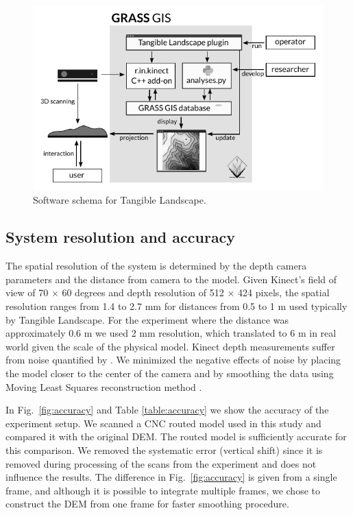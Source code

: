\documentclass[prodmode,acmtochi]{acmsmall} %
\begin{document}
\begin{figure}
\begin{center}
		\includegraphics{images/software-schema.pdf}
	\caption{Software schema for Tangible Landscape.}
	\label{fig:software_schema}
\end{center}
\end{figure}

\subsection{System resolution and accuracy}
The spatial resolution of the system is determined by the depth camera parameters
and the distance from camera to the model. Given Kinect's field of view of 70 $\times$ 60 degrees
and depth resolution of 512 $\times$ 424 pixels, the spatial resolution ranges
from 1.4 to 2.7 mm for distances from 0.5 to 1 m used typically by Tangible Landscape.
For the experiment where the distance was approximately 0.6 m we used 2 mm resolution, which
translated to 6 m in real world given the scale of the physical model.
Kinect depth measurements suffer from noise quantified by \cite{Hamed2015}.
We minimized the negative effects of noise by placing the model
closer to the center of the camera and by smoothing the data using Moving Least
Squares reconstruction method \cite{Rusu2011}.

In Fig.~\ref{fig:accuracy} and Table \ref{table:accuracy} 
we show the accuracy of the experiment setup.
We scanned a CNC routed model used in this study
and compared it with the original DEM.
The routed model is sufficiently accurate for this comparison.
We removed the systematic error (vertical shift) since it is removed
during processing of the scans from the experiment and does not influence the results.
The difference in Fig.~\ref{fig:accuracy} is given from a single frame,
and although it is possible to integrate multiple frames,
we chose to construct the DEM from one frame for faster smoothing procedure.
\end{document}
